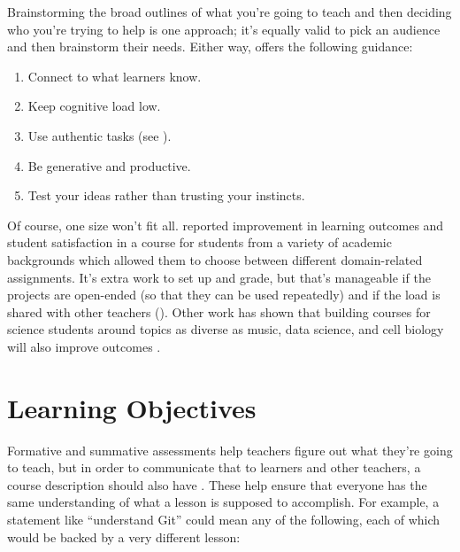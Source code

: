 Brainstorming the broad outlines of what you're going to teach and
then deciding who you're trying to help is one approach; it's equally
valid to pick an audience and then brainstorm their needs.  Either
way, \cite{Guzd2016} offers the following guidance:

\begin{enumerate}

\item
  Connect to what learners know.

\item
  Keep cognitive load low.

\item
  Use authentic tasks (see ).

\item
  Be generative and productive.

\item
  Test your ideas rather than trusting your instincts.

\end{enumerate}

Of course, one size won't fit all.  \cite{Alha2018} reported
improvement in learning outcomes and student satisfaction in a
course for students from a variety of academic backgrounds which
allowed them to choose between different domain-related assignments.
It's extra work to set up and grade, but that's manageable if the
projects are open-ended (so that they can be used repeatedly) and if
the load is shared with other teachers
().  Other work has shown that
building courses for science students around topics as diverse as
music, data science, and cell biology will also improve outcomes
\cite{Pete2017,Dahl2018,Ritz2018}.

\section{Learning Objectives}\label{s:process-objectives}

Formative and summative assessments help teachers figure out what
they're going to teach, but in order to communicate that to learners
and other teachers, a course description should also have
.  These help
ensure that everyone has the same understanding of what a lesson is
supposed to accomplish.  For example, a statement like ``understand
Git'' could mean any of the following, each of which would be backed
by a very different lesson:

